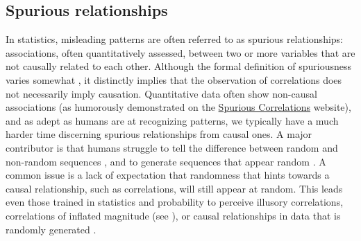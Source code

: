 \documentclass{article}
\theoremstyle{plain}
\theoremstyle{definition}
\theoremstyle{remark}
\begin{document}
\subsection{Spurious relationships}
In statistics, misleading patterns are often referred to as spurious relationships: associations, often quantitatively assessed, between two or more variables that are not causally related to each other. Although the formal definition of spuriousness varies somewhat \cite{haig2003spurious}, it distinctly implies that the observation of correlations does not necessarily imply causation. Quantitative data often show non-causal associations (as humorously demonstrated on the \href{http://www.tylervigen.com/spurious-correlations}{Spurious Correlations} website), and as adept as humans are at recognizing patterns, we typically have a much harder time discerning spurious relationships from causal ones. A major contributor is that humans struggle to tell the difference between random and non-random sequences \cite{falk1997making}, and to generate sequences that appear random \cite{ladouceur1996erroneous}. A common issue is a lack of expectation that randomness that hints towards a causal relationship, such as correlations, will still appear at random. This leads even those trained in statistics and probability to perceive illusory correlations, correlations of inflated magnitude (see \citet{nickerson1998confirmation}), or causal relationships in data that is randomly generated \cite{zgraggen2018investigating}.


 



\end{document}
